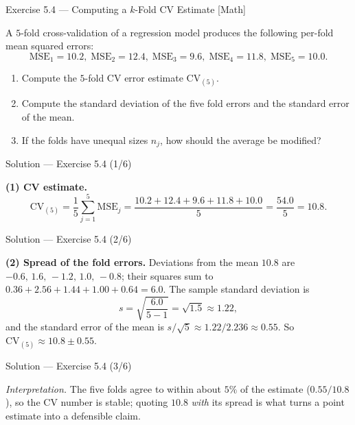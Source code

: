 \documentclass[aspectratio=169,11pt]{beamer}
\begin{document}
\begin{frame}{Exercise 5.4 --- Computing a $k$-Fold CV Estimate [Math]}
  \begin{exercise}
    A $5$-fold cross-validation of a regression model produces the
    following per-fold mean squared errors:
    \[
      \mathrm{MSE}_1 = 10.2,\;
      \mathrm{MSE}_2 = 12.4,\;
      \mathrm{MSE}_3 = 9.6,\;
      \mathrm{MSE}_4 = 11.8,\;
      \mathrm{MSE}_5 = 10.0 .
    \]
    \begin{enumerate}
      \item Compute the $5$-fold CV error estimate $\mathrm{CV}_{(5)}$.
      \item Compute the standard deviation of the five fold errors and
            the standard error of the mean.
      \item If the folds have unequal sizes $n_j$, how should the
            average be modified?
    \end{enumerate}
  \end{exercise}
\end{frame}

\begin{frame}{Solution --- Exercise 5.4 (1/6)}
  \begin{solutionbox}
    \textbf{(1) CV estimate.}
    \[
      \mathrm{CV}_{(5)} = \frac{1}{5}\sum_{j=1}^{5}\mathrm{MSE}_j
      = \frac{10.2+12.4+9.6+11.8+10.0}{5}
      = \frac{54.0}{5} = 10.8 .
    \]
  \end{solutionbox}
\end{frame}

\begin{frame}{Solution --- Exercise 5.4 (2/6)}
  \begin{solutionbox}
    \textbf{(2) Spread of the fold errors.}
    Deviations from the mean $10.8$ are
    $-0.6,\,1.6,\,-1.2,\,1.0,\,-0.8$; their squares sum to
    $0.36+2.56+1.44+1.00+0.64 = 6.0$. The sample standard deviation is
    \[
      s = \sqrt{\frac{6.0}{5-1}} = \sqrt{1.5} \approx 1.22 ,
    \]
    and the standard error of the mean is
    $s/\sqrt{5} \approx 1.22/2.236 \approx 0.55$.
    So $\mathrm{CV}_{(5)} \approx 10.8 \pm 0.55$.
  \end{solutionbox}
\end{frame}

\begin{frame}{Solution --- Exercise 5.4 (3/6)}
  \begin{solutionbox}
    \emph{Interpretation.} The five folds agree to within about $5\%$
    of the estimate ($0.55/10.8$), so the CV number is stable; quoting
    $10.8$ \emph{with} its spread is what turns a point estimate into a
    defensible claim.
  \end{solutionbox}
\end{frame}
\end{document}
